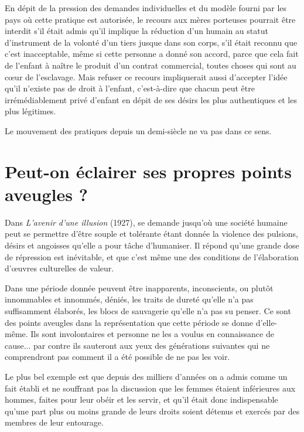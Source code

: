  En dépit de la pression des demandes individuelles et du modèle fourni par les pays où cette pratique est autorisée, le recours aux mères porteuses pourrait être interdit s'il était admis qu'il implique la réduction d'un humain au statut d'instrument de la volonté d'un tiers jusque dans son corps, s'il était reconnu que c'est inacceptable, même si cette personne a donné son accord, parce que cela fait de l'enfant à naître le produit d'un contrat commercial, toutes choses qui sont au cœur de l'esclavage. Mais refuser ce recours impliquerait aussi d'accepter l'idée qu'il n'existe pas de droit à l'enfant, c'est-à-dire que chacun peut être irrémédiablement privé d'enfant en dépit de ses désirs les plus authentiques et les plus légitimes. 

 Le mouvement des pratiques depuis un demi-siècle ne va pas dans ce sens.
 
 
  
 
 
 \chapter{Peut-on éclairer ses propres points aveugles ?} 
 
 Dans \emph{L'avenir d'une illusion} (1927),  se demande jusqu'où une société humaine peut se permettre d'être souple et tolérante étant donnée la violence des pulsions, désirs et angoisses qu'elle a pour tâche d'humaniser. Il répond qu'une grande dose de répression est inévitable, et que c'est même une des conditions de l'élaboration d'œuvres culturelles de valeur.

 Dans une période donnée peuvent être inapparents, inconscients, ou plutôt innommables et innommés, déniés, les traits de dureté qu'elle n'a pas suffisamment élaborés, les blocs de sauvagerie qu'elle n'a pas su penser. Ce sont des points aveugles dans la représentation que cette période se donne d'elle-même. Ils sont involontaires et personne ne les a voulus en connaissance de cause... par contre ils sauteront aux yeux des générations suivantes qui ne comprendront pas comment il a été possible de ne pas les voir. 
 
 Le plus bel exemple est que depuis des milliers d'années on a admis comme un fait établi et ne souffrant pas la discussion que les femmes étaient inférieures aux hommes, faites pour leur obéir et les servir, et qu'il était donc indispensable qu'une part plus ou moins grande de leurs droits soient détenus et exercés par des membres de leur entourage. 

